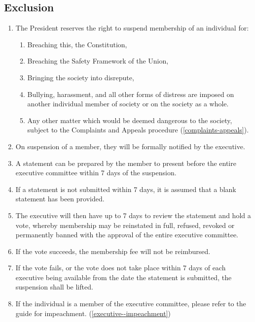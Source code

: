 \documentclass[parskip=half]{scrartcl}
\begin{document}
        \subsection{Exclusion}
            \label{membership--exclusion}
            \begin{enumerate}
                \item The President reserves the right to suspend membership of an individual for:
            \begin{enumerate}
                \item Breaching this, the Constitution,
                \item Breaching the Safety Framework of the Union,
                \item Bringing the society into disrepute,
                \item Bullying, harassment, and all other forms of distress are imposed on another individual member of society or on the society as a whole.
                \item Any other matter which would be deemed dangerous to the society, subject to the Complaints and Appeals procedure (\ref{complaints-appeals}). 
            \end{enumerate}

            \item On suspension of a member, they will be formally notified by the executive.

            \item A statement can be prepared by the member to present before the entire executive committee within 7 days of the suspension.
            
            \item If a statement is not submitted within 7 days, it is assumed that a blank statement has been provided.

            \item The executive will then have up to 7 days to review the statement and hold a vote, whereby membership may be reinstated in full, refused, revoked or permanently banned with the approval of the entire executive committee.
            
            \item If the vote succeeds, the membership fee will not be reimbursed.

            \item If the vote fails, or the vote does not take place within 7 days of each executive being available from the date the statement is submitted, the suspension shall be lifted.
 
            \item If the individual is a member of the executive committee, please refer to the guide for impeachment. (\ref{executive--impeachment})
        \end{enumerate}
        
\end{document}
